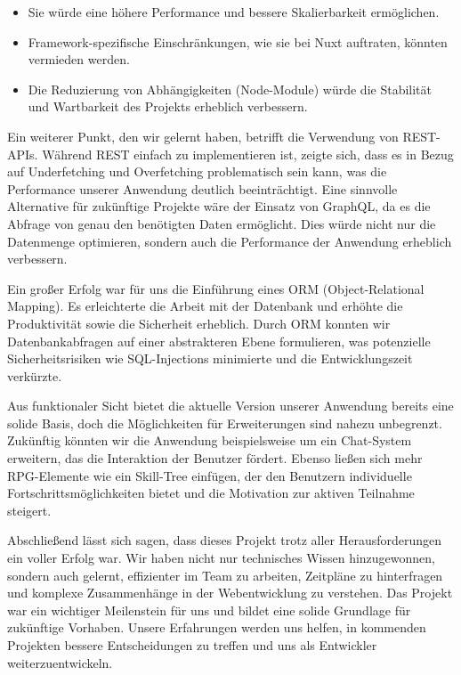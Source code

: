 \documentclass[a4paper,12pt]{article}
\begin{document}
\begin{itemize}
    \item Sie würde eine höhere Performance und bessere Skalierbarkeit
        ermöglichen.
    \item Framework-spezifische Einschränkungen, wie sie bei Nuxt auftraten,
        könnten vermieden werden.
    \item Die Reduzierung von Abhängigkeiten (Node-Module) würde die Stabilität
        und Wartbarkeit des Projekts erheblich verbessern.
\end{itemize}

Ein weiterer Punkt, den wir gelernt haben, betrifft die Verwendung von
REST-APIs. Während REST einfach zu implementieren ist, zeigte sich, dass es in
Bezug auf Underfetching und Overfetching problematisch sein kann, was die
Performance unserer Anwendung deutlich beeinträchtigt. Eine sinnvolle
Alternative für zukünftige Projekte wäre der Einsatz von GraphQL, da es die
Abfrage von genau den benötigten Daten ermöglicht. Dies würde nicht nur die
Datenmenge optimieren, sondern auch die Performance der Anwendung erheblich
verbessern.

Ein großer Erfolg war für uns die Einführung eines ORM (Object-Relational
Mapping). Es erleichterte die Arbeit mit der Datenbank und erhöhte die
Produktivität sowie die Sicherheit erheblich. Durch ORM konnten wir
Datenbankabfragen auf einer abstrakteren Ebene formulieren, was potenzielle
Sicherheitsrisiken wie SQL-Injections minimierte und die Entwicklungszeit
verkürzte.

Aus funktionaler Sicht bietet die aktuelle Version unserer Anwendung bereits
eine solide Basis, doch die Möglichkeiten für Erweiterungen sind nahezu
unbegrenzt. Zukünftig könnten wir die Anwendung beispielsweise um ein
Chat-System erweitern, das die Interaktion der Benutzer fördert. Ebenso ließen
sich mehr RPG-Elemente wie ein Skill-Tree einfügen, der den Benutzern
individuelle Fortschrittsmöglichkeiten bietet und die Motivation zur aktiven
Teilnahme steigert.

Abschließend lässt sich sagen, dass dieses Projekt trotz aller
Herausforderungen ein voller Erfolg war. Wir haben nicht nur technisches Wissen
hinzugewonnen, sondern auch gelernt, effizienter im Team zu arbeiten, Zeitpläne
zu hinterfragen und komplexe Zusammenhänge in der Webentwicklung zu verstehen.
Das Projekt war ein wichtiger Meilenstein für uns und bildet eine solide
Grundlage für zukünftige Vorhaben. Unsere Erfahrungen werden uns helfen, in
kommenden Projekten bessere Entscheidungen zu treffen und uns als Entwickler
weiterzuentwickeln.

\newpage
\printbibliography
\end{document}
